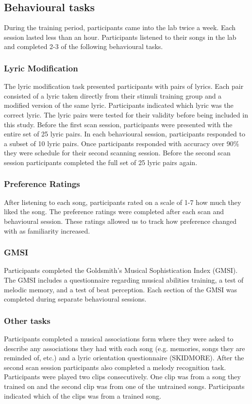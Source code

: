 \documentclass[12pt,letterpaper]{report}
\begin{document}
\subsection{Behavioural tasks}
During the training period, participants came into the lab twice a week.
Each session lasted less than an hour.
Participants listened to their songs in the lab and completed 2-3 of the following behavioural tasks. 
\subsubsection{Lyric Modification}
The lyric modification task presented participants with pairs of lyrics.
Each pair consisted of a lyric taken directly from their stimuli training group and a modified version of the same lyric. 
Participants indicated which lyric was the correct lyric.
The lyric pairs were tested for their validity before being included in this study. 
Before the first scan session, participants were presented with the entire set of 25 lyric pairs.
In each behavioural session, participants responded to a subset of 10 lyric pairs. 
Once participants responded with accuracy over 90\% they were schedule for their second scanning session.
Before the second scan session participants completed the full set of 25 lyric pairs again. 
\subsubsection{Preference Ratings}
After listening to each song, participants rated on a scale of 1-7 how much they liked the song.
The preference ratings were completed after each scan and behavioural session. 
These ratings allowed us to track how preference changed with as familiarity increased.
\subsubsection{GMSI}
Participants completed the Goldsmith's Musical Sophistication Index (GMSI).
The GMSI includes a questionnaire regarding musical abilities training, a test of melodic memory, and a test of beat perception.
Each section of the GMSI was completed during separate behavioural sessions. 
\subsubsection{Other tasks}
Participants completed a musical associations form where they were asked to describe any associations they had with each song (e.g. memories, songs they are reminded of, etc.) and a lyric orientation questionnaire (SKIDMORE). 
After the second scan session participants also completed a melody recognition task. 
Participants were played two clips consecutively. 
One clip was from a song they trained on and the second clip was from one of the untrained songs. 
Participants indicated which of the clips was from a trained song.
\end{document}
